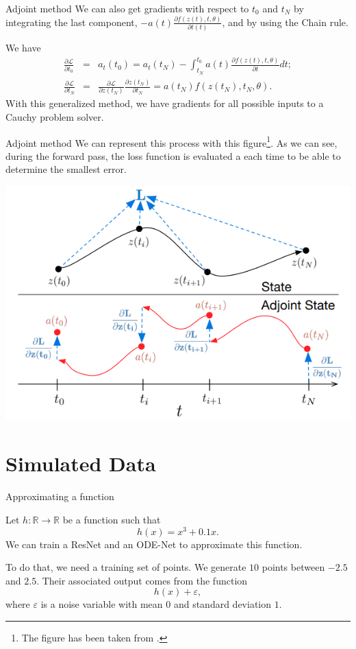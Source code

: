\documentclass[11pt]{beamer}
\begin{document}
\begin{frame}{Adjoint method}
We can also get gradients with respect to $t_0$ and $t_N$ by integrating the last component, $-a(t)\frac{\partial f(z(t),t,\theta)}{\partial t(t)}$, and by using the Chain rule. 

We have
\begin{eqnarray*}
\frac{\partial \mathcal{L}}{\partial t_0} &=& a_t(t_0) = a_t(t_N) - \int_{t_N}^{t_0} a(t) \frac{\partial f(z(t),t,\theta)}{\partial t} dt ; \\
\frac{\partial \mathcal{L}}{\partial t_N} &=& \frac{\partial \mathcal{L}}{\partial z(t_N)} \frac{\partial z(t_N)}{\partial t_N} = a(t_N)f(z(t_N),t_N,\theta).
\end{eqnarray*}
With this generalized method, we have gradients for all possible inputs to a Cauchy problem solver. 
\end{frame}

\begin{frame}{Adjoint method}
We can represent this process with this figure\footnote{The figure has been taken from \cite{12}.}. As we can see, during the forward pass, the loss function is evaluated a each time to be able to determine the smallest error.

\begin{center}
\includegraphics[scale=0.6]{fig2.png}
\end{center}
\end{frame}

\section{Simulated Data}

\begin{frame}{Approximating a function}

Let $h:\mathbb{R} \to \mathbb{R}$ be a function such that
$$
h(x) = x^3 + 0.1x.
$$
We can train a ResNet and an ODE-Net to approximate this function.

To do that, we need a training set of points. We generate $10$ points between $-2.5$ and $2.5$. Their associated output comes from the function
$$
h(x) + \varepsilon,
$$
where $\varepsilon$ is a noise variable with mean $0$ and standard deviation $1$.
\end{frame}
\end{document}
